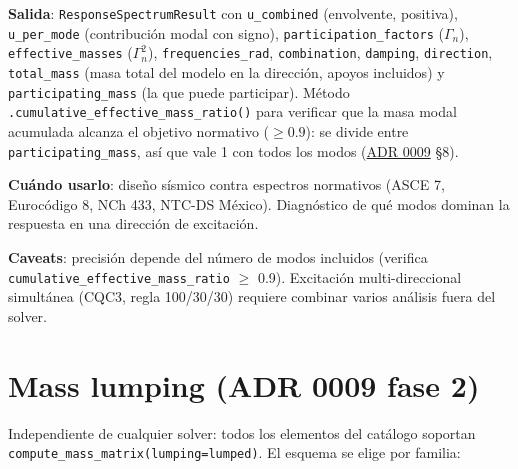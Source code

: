 \documentclass[11pt,oneside]{report}
\begin{document}
\textbf{Salida}: \texttt{ResponseSpectrumResult} con \texttt{u\_combined} (envolvente, positiva), \texttt{u\_per\_mode} (contribución modal con signo), \texttt{participation\_\allowbreak{}factors} ($\Gamma_n$), \texttt{effective\_masses} ($\Gamma_n^2$), \texttt{frequencies\_rad}, \texttt{combination}, \texttt{damping}, \texttt{direction}, \texttt{total\_mass} (masa total del modelo en la dirección, apoyos incluidos) y \texttt{participating\_\allowbreak{}mass} (la que puede participar). Método \texttt{.\allowbreak{}cumulative\_\allowbreak{}effective\_\allowbreak{}mass\_\allowbreak{}ratio()} para verificar que la masa modal acumulada alcanza el objetivo normativo ($\geq 0.9$): se divide entre \texttt{participating\_\allowbreak{}mass}, así que vale 1 con todos los modos (\href{https://github.com/jretamav/solidum-fem/blob/main/docs/adr/0009-analisis-modal-y-dinamico.md}{ADR 0009} §8).

\textbf{Cuándo usarlo}: diseño sísmico contra espectros normativos (ASCE 7, Eurocódigo 8, NCh 433, NTC-DS México). Diagnóstico de qué modos dominan la respuesta en una dirección de excitación.

\textbf{Caveats}: precisión depende del número de modos incluidos (verifica \texttt{cumulative\_\allowbreak{}effective\_\allowbreak{}mass\_\allowbreak{}ratio} \ensuremath{\ge} 0.9). Excitación multi-direccional simultánea (CQC3, regla 100/30/30) requiere combinar varios análisis fuera del solver.

\section{Mass lumping (ADR 0009 fase 2)}

Independiente de cualquier solver: todos los elementos del catálogo soportan \texttt{compute\_\allowbreak{}mass\_\allowbreak{}matrix(lumping=\textquotedbl{}lumped\textquotedbl{})}. El esquema se elige por familia:
\end{document}
